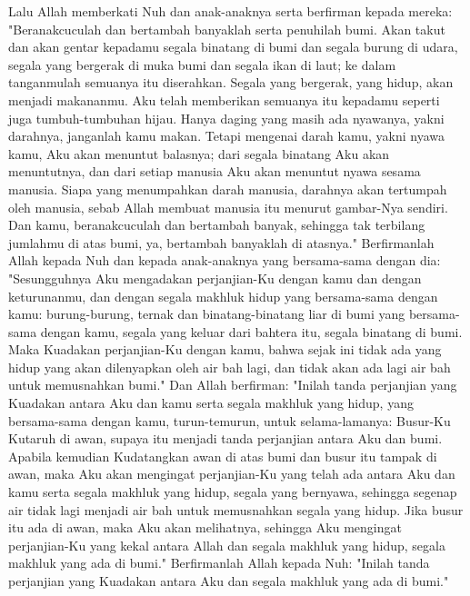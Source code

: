 \begin{biblechapter} %
 Lalu Allah memberkati Nuh dan anak-anaknya serta berfirman kepada mereka: "Beranakcuculah dan bertambah banyaklah serta penuhilah bumi.
\verse Akan takut dan akan gentar kepadamu segala binatang di bumi dan segala burung di udara, segala yang bergerak di muka bumi dan segala ikan di laut; ke dalam tanganmulah semuanya itu diserahkan.
\verse Segala yang bergerak, yang hidup, akan menjadi makananmu. Aku telah memberikan semuanya itu kepadamu seperti juga tumbuh-tumbuhan hijau.
\verse Hanya daging yang masih ada nyawanya, yakni darahnya, janganlah kamu makan.
\verse Tetapi mengenai darah kamu, yakni nyawa kamu, Aku akan menuntut balasnya; dari segala binatang Aku akan menuntutnya, dan dari setiap manusia Aku akan menuntut nyawa sesama manusia.
\verse Siapa yang menumpahkan darah manusia, darahnya akan tertumpah oleh manusia, sebab Allah membuat manusia itu menurut gambar-Nya sendiri.
\verse Dan kamu, beranakcuculah dan bertambah banyak, sehingga tak terbilang jumlahmu di atas bumi, ya, bertambah banyaklah di atasnya."
\verse Berfirmanlah Allah kepada Nuh dan kepada anak-anaknya yang bersama-sama dengan dia:
\verse "Sesungguhnya Aku mengadakan perjanjian-Ku dengan kamu dan dengan keturunanmu,
\verse dan dengan segala makhluk hidup yang bersama-sama dengan kamu: burung-burung, ternak dan binatang-binatang liar di bumi yang bersama-sama dengan kamu, segala yang keluar dari bahtera itu, segala binatang di bumi.
\verse Maka Kuadakan perjanjian-Ku dengan kamu, bahwa sejak ini tidak ada yang hidup yang akan dilenyapkan oleh air bah lagi, dan tidak akan ada lagi air bah untuk memusnahkan bumi."
\verse Dan Allah berfirman: "Inilah tanda perjanjian yang Kuadakan antara Aku dan kamu serta segala makhluk yang hidup, yang bersama-sama dengan kamu, turun-temurun, untuk selama-lamanya:
\verse Busur-Ku Kutaruh di awan, supaya itu menjadi tanda perjanjian antara Aku dan bumi.
\verse Apabila kemudian Kudatangkan awan di atas bumi dan busur itu tampak di awan,
\verse maka Aku akan mengingat perjanjian-Ku yang telah ada antara Aku dan kamu serta segala makhluk yang hidup, segala yang bernyawa, sehingga segenap air tidak lagi menjadi air bah untuk memusnahkan segala yang hidup.
\verse Jika busur itu ada di awan, maka Aku akan melihatnya, sehingga Aku mengingat perjanjian-Ku yang kekal antara Allah dan segala makhluk yang hidup, segala makhluk yang ada di bumi."
\verse Berfirmanlah Allah kepada Nuh: "Inilah tanda perjanjian yang Kuadakan antara Aku dan segala makhluk yang ada di bumi."

\end{biblechapter}
